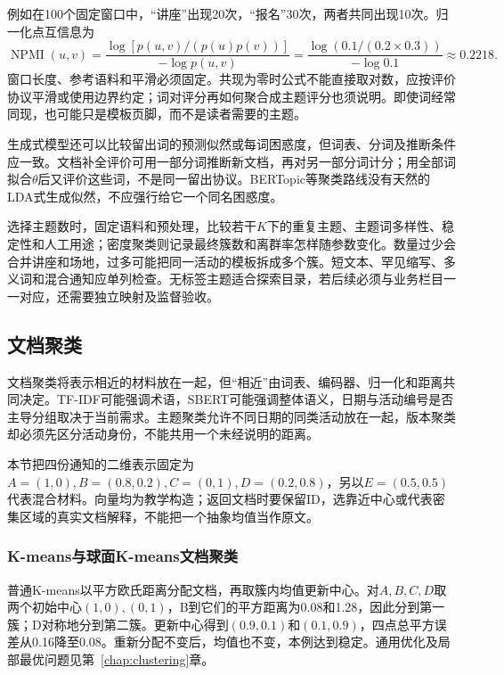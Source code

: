 例如在100个固定窗口中，“讲座”出现20次，“报名”30次，两者共同出现10次。归一化点互信息为
\[
 \operatorname{NPMI}(u,v)=
 \frac{\log[p(u,v)/(p(u)p(v))]}{-\log p(u,v)}
 =\frac{\log(0.1/(0.2\times0.3))}{-\log0.1}
 \approx0.2218.
\]
窗口长度、参考语料和平滑必须固定。共现为零时公式不能直接取对数，应按评价协议平滑或使用边界约定；词对评分再如何聚合成主题评分也须说明。即使词经常同现，也可能只是模板页脚，而不是读者需要的主题。

生成式模型还可以比较留出词的预测似然或每词困惑度，但词表、分词及推断条件应一致。文档补全评价可用一部分词推断新文档，再对另一部分词计分；用全部词拟合$\theta$后又评价这些词，不是同一留出协议。BERTopic等聚类路线没有天然的LDA式生成似然，不应强行给它一个同名困惑度。

选择主题数时，固定语料和预处理，比较若干$K$下的重复主题、主题词多样性、稳定性和人工用途；密度聚类则记录最终簇数和离群率怎样随参数变化。数量过少会合并讲座和场地，过多可能把同一活动的模板拆成多个簇。短文本、罕见缩写、多义词和混合通知应单列检查。无标签主题适合探索目录，若后续必须与业务栏目一一对应，还需要独立映射及监督验收。

\subsection{文档聚类}
\label{sec:nlp-classification-clustering}

文档聚类将表示相近的材料放在一起，但“相近”由词表、编码器、归一化和距离共同决定。TF-IDF可能强调术语，SBERT可能强调整体语义，日期与活动编号是否主导分组取决于当前需求。主题聚类允许不同日期的同类活动放在一起，版本聚类却必须先区分活动身份，不能共用一个未经说明的距离。

本节把四份通知的二维表示固定为$A=(1,0),B=(0.8,0.2),C=(0,1),D=(0.2,0.8)$，另以$E=(0.5,0.5)$代表混合材料。向量均为教学构造；返回文档时要保留ID，选靠近中心或代表密集区域的真实文档解释，不能把一个抽象均值当作原文。

\subsubsection{K-means与球面K-means文档聚类}
\label{sec:nlp-classification-kmeans}

普通K-means以平方欧氏距离分配文档，再取簇内均值更新中心。对$A,B,C,D$取两个初始中心$(1,0),(0,1)$，B到它们的平方距离为0.08和1.28，因此分到第一簇；D对称地分到第二簇。更新中心得到$(0.9,0.1)$和$(0.1,0.9)$，四点总平方误差从0.16降至0.08。重新分配不变后，均值也不变，本例达到稳定。通用优化及局部最优问题见第~\ref{chap:clustering}章。

